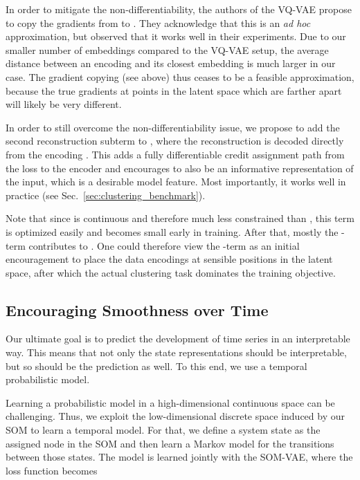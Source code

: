 \documentclass{article}
\begin{document}
In order to mitigate the non-differentiability, the authors of the VQ-VAE propose to copy the gradients from  to .
They acknowledge that this is an \emph{ad hoc} approximation, but observed that it works well in their experiments.
Due to our smaller number of embeddings compared to the VQ-VAE setup, the average distance between an encoding and its closest embedding is much larger in our case.
The gradient copying (see above) thus ceases to be a feasible approximation, because the true gradients at points in the latent space which are farther apart will likely be very different.

In order to still overcome the non-differentiability issue, we propose to add the second reconstruction subterm to , where the reconstruction  is decoded directly from the encoding .
This adds a fully differentiable credit assignment path from the loss to the encoder and encourages  to also be an informative representation of the input, which is a desirable model feature.
Most importantly, it works well in practice (see Sec.\ \ref{sec:clustering_benchmark}).

Note that since  is continuous and therefore much less constrained than , this term is optimized easily and becomes small early in training.
After that, mostly the -term contributes to .
One could therefore view the -term as an initial encouragement to place the data encodings at sensible positions in the latent space, after which the actual clustering task dominates the training objective.



\subsection{Encouraging Smoothness over Time}\label{sec:probabilistic_model}

Our ultimate goal is to predict the development of time series in an interpretable way.
This means that not only the state representations should be interpretable, but so should be the prediction as well.
To this end, we use a temporal probabilistic model.

Learning a probabilistic model in a high-dimensional continuous space can be challenging.
Thus, we exploit the low-dimensional discrete space induced by our SOM to learn a temporal model.
For that, we define a system state as the assigned node in the SOM and then learn a Markov model for the transitions between those states.
The model is learned jointly with the SOM-VAE, where the loss function becomes
\end{document}
